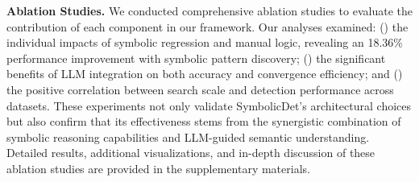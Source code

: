 \noindent
\textbf{Ablation Studies.}
We conducted comprehensive ablation studies to evaluate the contribution of each component in our framework. Our analyses examined: () the individual impacts of symbolic regression and manual logic, revealing an 18.36\% performance improvement with symbolic pattern discovery; () the significant benefits of LLM integration on both accuracy and convergence efficiency; and () the positive correlation between search scale and detection performance across datasets. These experiments not only validate SymbolicDet's architectural choices but also confirm that its effectiveness stems from the synergistic combination of symbolic reasoning capabilities and LLM-guided semantic understanding. Detailed results, additional visualizations, and in-depth discussion of these ablation studies are provided in the supplementary materials.
